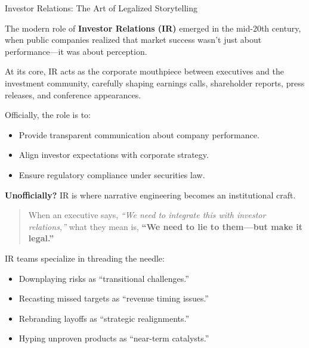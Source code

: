 \begin{HistoricalSidebar}{Investor Relations: The Art of Legalized Storytelling}

    The modern role of \textbf{Investor Relations (IR)} emerged in the mid-20th century,  
    when public companies realized that market success wasn’t just about performance—it was about perception.
    
    \medskip
    
    At its core, IR acts as the corporate mouthpiece between executives and the investment community,  
    carefully shaping earnings calls, shareholder reports, press releases, and conference appearances.

    \medskip
    
    Officially, the role is to:

    \medskip

    \begin{itemize}
        \item Provide transparent communication about company performance.
        \item Align investor expectations with corporate strategy.
        \item Ensure regulatory compliance under securities law.
    \end{itemize}
    
    \medskip
    
    \textbf{Unofficially?}  
    IR is where narrative engineering becomes an institutional craft.
    
    \medskip
    
    \begin{quote}
    When an executive says, \textit{“We need to integrate this with investor relations,”}  
    what they mean is,  
    \textbf{“We need to lie to them—but make it legal.”}
    \end{quote}
    
    \medskip
    
    IR teams specialize in threading the needle:

    \medskip

    \begin{itemize}
        \item Downplaying risks as “transitional challenges.”
        \item Recasting missed targets as “revenue timing issues.”
        \item Rebranding layoffs as “strategic realignments.”
        \item Hyping unproven products as “near-term catalysts.”
    \end{itemize}
    

\end{HistoricalSidebar}
